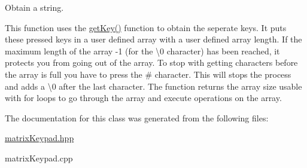 Obtain a string. 

This function uses the \hyperlink{classmatrix_keypad_adb0562ac12409dd390afe759297d7a95}{get\+Key()} function to obtain the seperate keys. It puts these pressed keys in a user defined array with a user defined array length. If the maximum length of the array -\/1 (for the \textquotesingle{}\textbackslash{}0\textquotesingle{} character) has been reached, it protects you from going out of the array. To stop with getting characters before the array is full you have to press the \textquotesingle{}\#\textquotesingle{} character. This will stops the process and adds a \textquotesingle{}\textbackslash{}0\textquotesingle{} after the last character. The function returns the array size usable with for loops to go through the array and execute operations on the array. 

The documentation for this class was generated from the following files\+:\begin{DoxyCompactItemize}
\item 
\hyperlink{matrix_keypad_8hpp}{matrix\+Keypad.\+hpp}\item 
matrix\+Keypad.\+cpp\end{DoxyCompactItemize}
